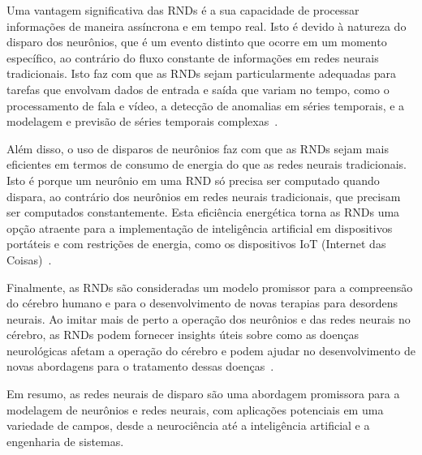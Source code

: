 Uma vantagem significativa das RNDs é a sua capacidade de processar informações de maneira assíncrona e em tempo real. Isto é
devido à natureza do disparo dos neurônios, que é um evento distinto que ocorre em um momento específico, ao contrário do fluxo
constante de informações em redes neurais tradicionais. Isto faz com que as RNDs sejam particularmente adequadas para tarefas que
envolvam dados de entrada e saída que variam no tempo, como o processamento de fala e vídeo, a detecção de anomalias em séries
temporais, e a modelagem e previsão de séries temporais complexas~\cite{ponulakIntroductionSpikingNeural2011}.

Além disso, o uso de disparos de neurônios faz com que as RNDs sejam mais eficientes em termos de consumo de energia do que as
redes neurais tradicionais. Isto é porque um neurônio em uma RND só precisa ser computado quando dispara, ao contrário dos
neurônios em redes neurais tradicionais, que precisam ser computados constantemente. Esta eficiência energética torna as RNDs uma
opção atraente para a implementação de inteligência artificial em dispositivos portáteis e com restrições de energia, como os
dispositivos IoT (Internet das Coisas)~\cite{daviesLoihiNeuromorphicProcessor2018}.

Finalmente, as RNDs são consideradas um modelo promissor para a compreensão do cérebro humano e para o desenvolvimento de novas
terapias para desordens neurais. Ao imitar mais de perto a operação dos neurônios e das redes neurais no cérebro, as RNDs podem
fornecer insights úteis sobre como as doenças neurológicas afetam a operação do cérebro e podem ajudar no desenvolvimento de novas
abordagens para o tratamento dessas doenças~\cite{eliasmithHowBuildBrain2013}.

Em resumo, as redes neurais de disparo são uma abordagem promissora para a modelagem de neurônios e redes neurais, com aplicações
potenciais em uma variedade de campos, desde a neurociência até a inteligência artificial e a engenharia de sistemas.









